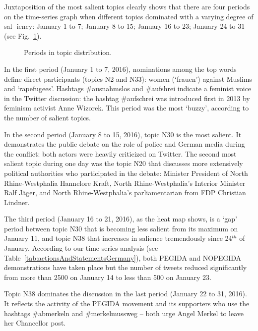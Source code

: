 Juxtaposition of the most salient topics clearly shows that there are four periods on the time-series graph when different topics dominated with a varying degree of sal- iency: January 1 to 7; January 8 to 15; January 16 to 23; January 24 to 31 (see Fig.~\cref{fig:topicDistributionPeriods}).

\begin{figure}[ht]
	\caption{Periods in topic distribution.}\label{fig:topicDistributionPeriods}
\end{figure}

In the first period (January 1 to 7, 2016), nominations among the top words define direct participants (topics N2 and N33): women (‘frauen’) against Muslims and ‘rapefugees’. Hashtags \#ausnahmslos and \#aufshrei indicate a feminist voice in the Twitter discussion: the hashtag \#aufschrei was introduced first in 2013 by feminism activist Anne Wizorek. This period was the most ‘buzzy’, according to the number of salient topics.

In the second period (January 8 to 15, 2016), topic N30 is the most salient. It demonstrates the public debate on the role of police and German media during the conflict: both actors were heavily criticized on Twitter. The second most salient topic during one day was the topic N20 that discusses more extensively political authorities who participated in the debate: Minister President of North Rhine-Westphalia Hannelore Kraft, North Rhine-Westphalia’s Interior Minister Ralf Jäger, and North Rhine-Westphalia’s parliamentarian from FDP Christian Lindner.

The third period (January 16 to 21, 2016), as the heat map shows, is a ‘gap’ period between topic N30 that is becoming less salient from its maximum on January 11, and topic N38 that increases in salience tremendously since 24\(^{th}\) of January. According to our time series analysis (see Table~\cref{tab:actionsAndStatementsGermany}), both PEGIDA and NOPEGIDA demonstrations have taken place but the number of tweets reduced significantly from more than 2500 on January 14 to less than 500 on January 23.

Topic N38 dominates the discussion in the last period (January 22 to 31, 2016). It reflects the activity of the PEGIDA movement and its supporters who use the hashtags \#abmerkeln and \#merkelmussweg -- both urge Angel Merkel to leave her Chancellor post.

